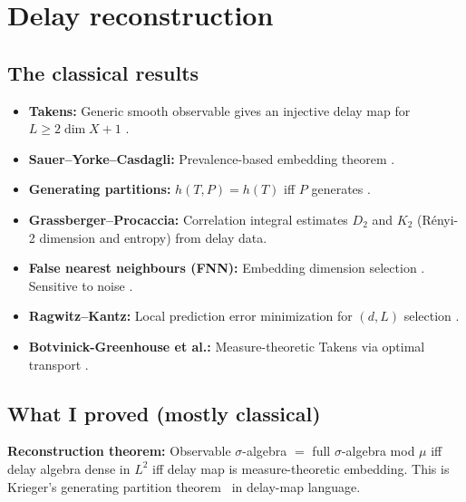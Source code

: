 \section{Delay reconstruction}
\label{sec:reconstruction}

\subsection{The classical results}

\begin{itemize}
  \item \textbf{Takens:} Generic smooth observable gives an
    injective delay map for $L \geq 2 \dim X + 1$ \cite{Takens1981}.

  \item \textbf{Sauer--Yorke--Casdagli:} Prevalence-based
    embedding theorem \cite{SauerYorkeCasdagli1991}.

  \item \textbf{Generating partitions:}
    $h(T, P) = h(T)$ iff $P$ generates
    \cite{Sinai1959, Krieger1970}.

  \item \textbf{Grassberger--Procaccia:} Correlation integral
    estimates $D_2$ and $K_2$ (R\'{e}nyi-2 dimension and entropy)
    from delay data.

  \item \textbf{False nearest neighbours (FNN):} Embedding
    dimension selection \cite{KennelBrownAbarbanel1992}.  Sensitive
    to noise \cite{RhodesMorari1997}.

  \item \textbf{Ragwitz--Kantz:} Local prediction error
    minimization for $(d, L)$ selection \cite{RagwitzKantz2002}.

  \item \textbf{Botvinick-Greenhouse et al.:}
    Measure-theoretic Takens via optimal transport
    \cite{BotvinickGreenhouse2025}.
\end{itemize}

\subsection{What I proved (mostly classical)}

\textbf{Reconstruction theorem:} Observable $\sigma$-algebra $=$
full $\sigma$-algebra mod $\mu$ iff delay algebra dense in $L^2$
iff delay map is measure-theoretic embedding.  This is
Krieger's generating partition theorem~\cite{Krieger1970} in
delay-map language.

